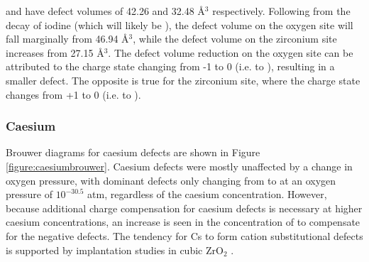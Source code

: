  and  have defect volumes of 42.26 and 32.48 \r{A}$^{3}$ respectively. Following from the decay of iodine (which will likely be ), the defect volume on the oxygen site will fall marginally from 46.94 \r{A}$^{3}$, while the defect volume on the zirconium site increases from 27.15 \r{A}$^{3}$. The defect volume reduction on the oxygen site can be attributed to the charge state changing from -1 to 0 (i.e.  to ), resulting in a smaller defect. The opposite is true for the zirconium site, where the charge state changes from +1 to 0 (i.e.  to ).

\subsubsection{Caesium}

Brouwer diagrams for caesium defects are shown in Figure \ref{figure:caesiumbrouwer}. Caesium defects were mostly unaffected by a change in oxygen pressure, with dominant defects only changing from  to  at an oxygen pressure of $10^{-30.5}$ atm, regardless of the caesium concentration. However, because additional charge compensation for caesium defects is necessary at higher caesium concentrations, an increase is seen in the concentration of  to compensate for the negative  defects. The tendency for Cs to form cation substitutional defects is supported by implantation studies in cubic ZrO$_{2}$ \cite{Thome1999}.

